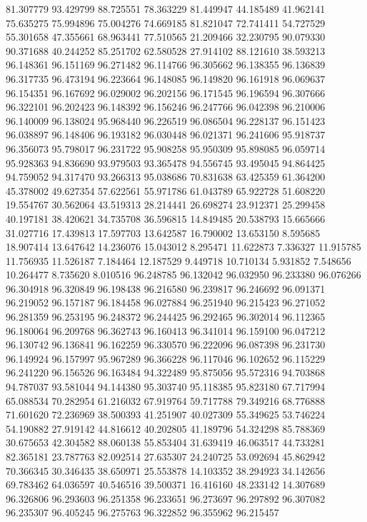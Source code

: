 81.307779
93.429799
88.725551
78.363229
81.449947
44.185489
41.962141
75.635275
75.994896
75.004276
74.669185
81.821047
72.741411
54.727529
55.301658
47.355661
68.963441
77.510565
21.209466
32.230795
90.079330
90.371688
40.244252
85.251702
62.580528
27.914102
88.121610
38.593213
96.148361
96.151169
96.271482
96.114766
96.305662
96.138355
96.136839
96.317735
96.473194
96.223664
96.148085
96.149820
96.161918
96.069637
96.154351
96.167692
96.029002
96.202156
96.171545
96.196594
96.307666
96.322101
96.202423
96.148392
96.156246
96.247766
96.042398
96.210006
96.140009
96.138024
95.968440
96.226519
96.086504
96.228137
96.151423
96.038897
96.148406
96.193182
96.030448
96.021371
96.241606
95.918737
96.356073
95.798017
96.231722
95.908258
95.950309
95.898085
96.059714
95.928363
94.836690
93.979503
93.365478
94.556745
93.495045
94.864425
94.759052
94.317470
93.266313
95.038686
70.831638
63.425359
61.364200
45.378002
49.627354
57.622561
55.971786
61.043789
65.922728
51.608220
19.554767
30.562064
43.519313
28.214441
26.698274
23.912371
25.299458
40.197181
38.420621
34.735708
36.596815
14.849485
20.538793
15.665666
31.027716
17.439813
17.597703
13.642587
16.790002
13.653150
8.595685
18.907414
13.647642
14.236076
15.043012
8.295471
11.622873
7.336327
11.915785
11.756935
11.526187
7.184464
12.187529
9.449718
10.710134
5.931852
7.548656
10.264477
8.735620
8.010516
96.248785
96.132042
96.032950
96.233380
96.076266
96.304918
96.320849
96.198438
96.216580
96.239817
96.246692
96.091371
96.219052
96.157187
96.184458
96.027884
96.251940
96.215423
96.271052
96.281359
96.253195
96.248372
96.244425
96.292465
96.302014
96.112365
96.180064
96.209768
96.362743
96.160413
96.341014
96.159100
96.047212
96.130742
96.136841
96.162259
96.330570
96.222096
96.087398
96.231730
96.149924
96.157997
95.967289
96.366228
96.117046
96.102652
96.115229
96.241220
96.156526
96.163484
94.322489
95.875056
95.572316
94.703868
94.787037
93.581044
94.144380
95.303740
95.118385
95.823180
67.717994
65.088534
70.282954
61.216032
67.919764
59.717788
79.349216
68.776888
71.601620
72.236969
38.500393
41.251907
40.027309
55.349625
53.746224
54.190882
27.919142
44.816612
40.202805
41.189796
54.324298
85.788369
30.675653
42.304582
88.060138
55.853404
31.639419
46.063517
44.733281
82.365181
23.787763
82.092514
27.635307
24.240725
53.092694
45.862942
70.366345
30.346435
38.650971
25.553878
14.103352
38.294923
34.142656
69.783462
64.036597
40.546516
39.500371
16.416160
48.233142
14.307689
96.326806
96.293603
96.251358
96.233651
96.273697
96.297892
96.307082
96.235307
96.405245
96.275763
96.322852
96.355962
96.215457
